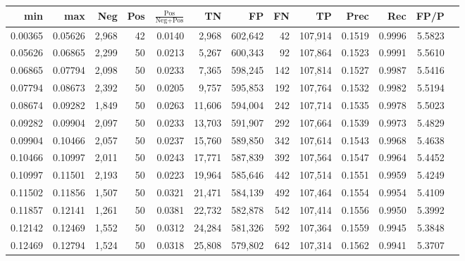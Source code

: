 \begin{tabular}{rrrrrrrrrrrrr}
\toprule
    min &     max &   Neg & Pos & $\frac{\text{Pos}}{\text{Neg}+\text{Pos}}$ &      TN &      FP &      FN &      TP &   Prec &    Rec &   FP/P \\
\midrule
0.00365 & 0.05626 & 2,968 &  42 &                                     0.0140 &   2,968 & 602,642 &      42 & 107,914 & 0.1519 & 0.9996 & 5.5823 \\
0.05626 & 0.06865 & 2,299 &  50 &                                     0.0213 &   5,267 & 600,343 &      92 & 107,864 & 0.1523 & 0.9991 & 5.5610 \\
0.06865 & 0.07794 & 2,098 &  50 &                                     0.0233 &   7,365 & 598,245 &     142 & 107,814 & 0.1527 & 0.9987 & 5.5416 \\
0.07794 & 0.08673 & 2,392 &  50 &                                     0.0205 &   9,757 & 595,853 &     192 & 107,764 & 0.1532 & 0.9982 & 5.5194 \\
0.08674 & 0.09282 & 1,849 &  50 &                                     0.0263 &  11,606 & 594,004 &     242 & 107,714 & 0.1535 & 0.9978 & 5.5023 \\
0.09282 & 0.09904 & 2,097 &  50 &                                     0.0233 &  13,703 & 591,907 &     292 & 107,664 & 0.1539 & 0.9973 & 5.4829 \\
0.09904 & 0.10466 & 2,057 &  50 &                                     0.0237 &  15,760 & 589,850 &     342 & 107,614 & 0.1543 & 0.9968 & 5.4638 \\
0.10466 & 0.10997 & 2,011 &  50 &                                     0.0243 &  17,771 & 587,839 &     392 & 107,564 & 0.1547 & 0.9964 & 5.4452 \\
0.10997 & 0.11501 & 2,193 &  50 &                                     0.0223 &  19,964 & 585,646 &     442 & 107,514 & 0.1551 & 0.9959 & 5.4249 \\
0.11502 & 0.11856 & 1,507 &  50 &                                     0.0321 &  21,471 & 584,139 &     492 & 107,464 & 0.1554 & 0.9954 & 5.4109 \\
0.11857 & 0.12141 & 1,261 &  50 &                                     0.0381 &  22,732 & 582,878 &     542 & 107,414 & 0.1556 & 0.9950 & 5.3992 \\
0.12142 & 0.12469 & 1,552 &  50 &                                     0.0312 &  24,284 & 581,326 &     592 & 107,364 & 0.1559 & 0.9945 & 5.3848 \\
0.12469 & 0.12794 & 1,524 &  50 &                                     0.0318 &  25,808 & 579,802 &     642 & 107,314 & 0.1562 & 0.9941 & 5.3707 \\

\end{tabular}

